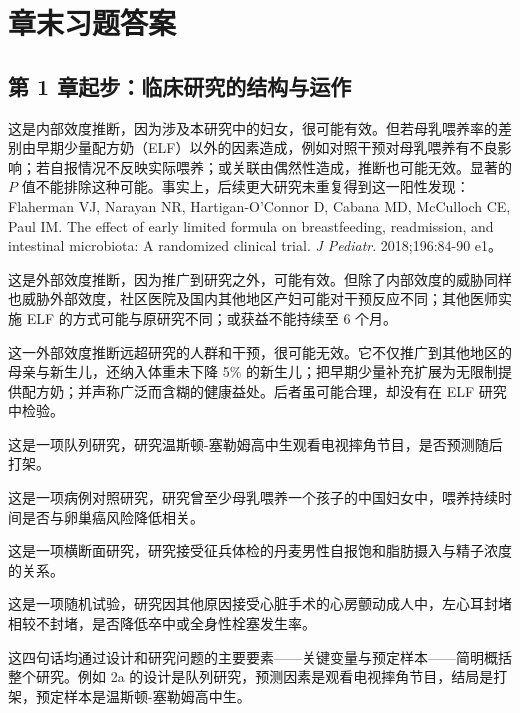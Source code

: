 \chapter*{章末习题答案}
\section{第 1 章\quad 起步：临床研究的结构与运作}
\begin{answerlist}
\item[1a.] 这是内部效度推断，因为涉及本研究中的妇女，很可能有效。但若母乳喂养率的差别由早期少量配方奶（ELF）以外的因素造成，例如对照干预对母乳喂养有不良影响；若自报情况不反映实际喂养；或关联由偶然性造成，推断也可能无效。显著的 $P$ 值不能排除这种可能。事实上，后续更大研究未重复得到这一阳性发现：Flaherman VJ, Narayan NR, Hartigan-O’Connor D, Cabana MD, McCulloch CE, Paul IM. The effect of early limited formula on breastfeeding, readmission, and intestinal microbiota: A randomized clinical trial. \textit{J Pediatr}. 2018;196:84-90 e1。
\item[1b.] 这是外部效度推断，因为推广到研究之外，可能有效。但除了内部效度的威胁同样也威胁外部效度，社区医院及国内其他地区产妇可能对干预反应不同；其他医师实施 ELF 的方式可能与原研究不同；或获益不能持续至 6 个月。
\item[1c.] 这一外部效度推断远超研究的人群和干预，很可能无效。它不仅推广到其他地区的母亲与新生儿，还纳入体重未下降 5\% 的新生儿；把早期少量补充扩展为无限制提供配方奶；并声称广泛而含糊的健康益处。后者虽可能合理，却没有在 ELF 研究中检验。
\item[2a.] 这是一项队列研究，研究温斯顿-塞勒姆高中生观看电视摔角节目，是否预测随后打架。
\item[2b.] 这是一项病例对照研究，研究曾至少母乳喂养一个孩子的中国妇女中，喂养持续时间是否与卵巢癌风险降低相关。
\item[2c.] 这是一项横断面研究，研究接受征兵体检的丹麦男性自报饱和脂肪摄入与精子浓度的关系。
\item[2d.] 这是一项随机试验，研究因其他原因接受心脏手术的心房颤动成人中，左心耳封堵相较不封堵，是否降低卒中或全身性栓塞发生率。
\end{answerlist}
这四句话均通过设计和研究问题的主要要素——关键变量与预定样本——简明概括整个研究。例如 2a 的设计是队列研究，预测因素是观看电视摔角节目，结局是打架，预定样本是温斯顿-塞勒姆高中生。

